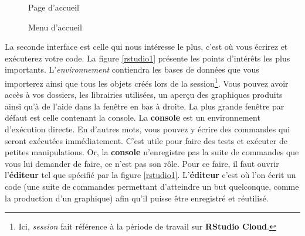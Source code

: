 \documentclass[10.5pt,a4paper]{article}
\begin{document}
\begin{figure}[H]
  \centering
  \caption{Page d'accueil}
  \label{home}
\end{figure}

\begin{figure}[H]
  \centering
  \caption{Menu d'accueil}
  \label{homeMenu}
\end{figure}

  La seconde interface est celle qui nous intéresse le plus, c'est où vous écrirez et exécuterez votre code. La figure \ref{rstudio1} présente les points d'intérêts les plus importants. L'\emph{environnement} contiendra les bases de données que vous importerez ainsi que tous les objets créés lors de la session\footnote{Ici, \emph{session} fait référence à la période de travail sur \textbf{RStudio Cloud}.}. Vous pouvez avoir accès à vos dossiers, les librairies utilisées, un aperçu des graphiques produits ainsi qu'à de l'aide dans la fenêtre en bas à droite. La plus grande fenêtre par défaut est celle contenant la console. La \textbf{console} est un environnement d'exécution directe. En d'autres mots, vous pouvez y écrire des commandes qui seront exécutées immédiatement. C'est utile pour faire des tests et exécuter de petites manipulations. Or, la \textbf{console} n'enregistre pas la suite de commandes que vous lui demander de faire, ce n'est pas son rôle. Pour ce faire, il faut ouvrir l'\textbf{éditeur} tel que spécifié par la figure \ref{rstudio1}. L'\textbf{éditeur} c'est où l'on écrit un code (une suite de commandes permettant d'atteindre un but quelconque, comme la production d'un graphique) afin qu'il puisse être enregistré et réutilisé.  
  
\end{document}
